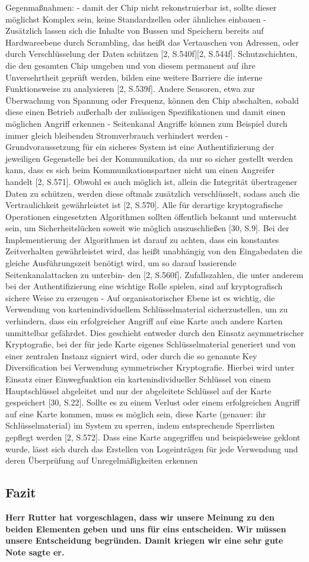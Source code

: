 Gegenmaßnahmen:
- damit der Chip nicht rekonstruierbar ist, sollte dieser möglichst Komplex sein, keine Standardzellen oder ähnliches einbauen
- Zusätzlich lassen sich die Inhalte von Bussen und Speichern bereits auf Hardwareebene
  durch Scrambling, das heißt das Vertauschen von Adressen, oder durch Verschlüsselung
  der Daten schützen [2, S.540f][2, S.544f]. Schutzschichten, die den gesamten Chip umgeben
  und von diesem permanent auf ihre Unversehrtheit geprüft werden, bilden eine weitere
  Barriere die interne Funktionsweise zu analysieren [2, S.539f]. Andere Sensoren, etwa
  zur Überwachung von Spannung oder Frequenz, können den Chip abschalten, sobald
  diese einen Betrieb außerhalb der zulässigen Spezifikationen und damit einen möglichen
  Angriff erkennen
- Seitenkanal Angriffe können zum Beispiel durch immer gleich bleibenden Stromverbrauch verhindert werden
- Grundvoraussetzung für ein sicheres System ist eine Authentifizierung der jeweiligen
  Gegenstelle bei der Kommunikation, da nur so sicher gestellt werden kann, dass es sich
  beim Kommunikationspartner nicht um einen Angreifer handelt [2, S.571]. Obwohl es
  auch möglich ist, allein die Integrität übertragener Daten zu schützen, werden diese
  oftmals zusätzlich verschlüsselt, sodass auch die Vertraulichkeit gewährleistet ist [2, S.570].
  Alle für derartige kryptografische Operationen eingesetzten Algorithmen sollten öffentlich
  bekannt und untersucht sein, um Sicherheitslücken soweit wie möglich auszuschließen [30,
  S.9].
  Bei der Implementierung der Algorithmen ist darauf zu achten, dass ein konstantes
  Zeitverhalten gewährleistet wird, das heißt unabhängig von den Eingabedaten die gleiche
  Ausführungszeit benötigt wird, um so darauf basierende Seitenkanalattacken zu unterbin-
  den [2, S.560f]. Zufallszahlen, die unter anderem bei der Authentifizierung eine wichtige
  Rolle spielen, sind auf kryptografisch sichere Weise zu erzeugen
- Auf organisatorischer Ebene ist es wichtig, die Verwendung von kartenindividuellem
  Schlüsselmaterial sicherzustellen, um zu verhindern, dass ein erfolgreicher Angriff auf
  eine Karte auch andere Karten unmittelbar gefährdet. Dies geschieht entweder durch den
  Einsatz asymmetrischer Kryptografie, bei der für jede Karte eigenes Schlüsselmaterial
  generiert und von einer zentralen Instanz signiert wird, oder durch die so genannte
  Key Diversification bei Verwendung symmetrischer Kryptografie. Hierbei wird unter
  Einsatz einer Einwegfunktion ein kartenindividueller Schlüssel von einem Hauptschlüssel
  abgeleitet und nur der abgeleitete Schlüssel auf der Karte gespeichert [30, S.22].
  Sollte es zu einem Verlust oder einem erfolgreichen Angriff auf eine Karte kommen,
  muss es möglich sein, diese Karte (genauer: ihr Schlüsselmaterial) im System zu sperren,
  indem entsprechende Sperrlisten gepflegt werden [2, S.572]. Dass eine Karte angegriffen
  und beispielsweise geklont wurde, lässt sich durch das Erstellen von Logeinträgen für
  jede Verwendung und deren Überprüfung auf Unregelmäßigkeiten erkennen

\subsection{Fazit}


\textbf{Herr Rutter hat vorgeschlagen, dass wir unsere Meinung zu den beiden Elementen geben und uns für 
eins entscheiden. Wir müssen unsere Entscheidung begründen. Damit kriegen wir eine sehr gute Note sagte er.}